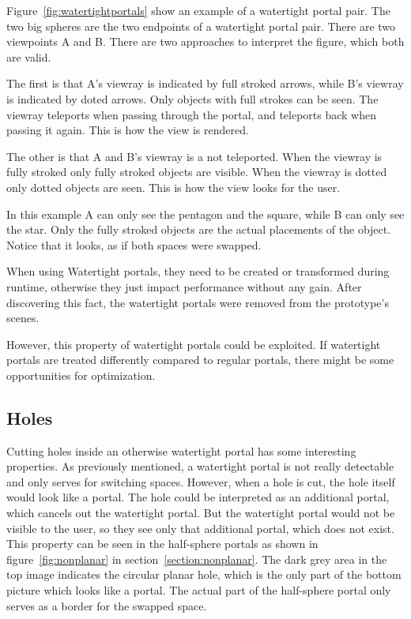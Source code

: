 Figure~\ref{fig:watertightportals} show an example of a watertight portal pair. The two big spheres are the two \glspl{endpoint} of a watertight portal pair. There are two viewpoints A and B.
There are two approaches to interpret the figure, which both are valid.

The first is that A's \gls{viewray} is indicated by full stroked arrows, while B's \gls{viewray} is indicated by doted arrows. Only objects with full strokes can be seen. The \gls{viewray} teleports when passing through the portal, and teleports back when passing it again. This is how the view is rendered.

The other is that A and B's \gls{viewray} is a not teleported. When the \gls{viewray} is fully stroked only fully stroked objects are visible. When the \gls{viewray} is dotted only dotted objects are seen. This is how the view looks for the user.

In this example A can only see the pentagon and the square, while B can only see the star. Only the fully stroked objects are the actual placements of the object. Notice that it looks, as if both spaces were swapped.

When using Watertight portals, they need to be created or transformed during runtime, otherwise they just impact performance without any gain. After discovering this fact, the watertight portals were removed from the prototype's scenes.

However, this property of watertight portals could be exploited. If watertight portals are treated differently compared to regular portals, there might be some opportunities for optimization.

\subsection{Holes}
Cutting holes inside an otherwise watertight portal has some interesting properties. As previously mentioned, a watertight portal is not really detectable and only serves for switching spaces. However, when a hole is cut, the hole itself would look like a portal. The hole could be interpreted as an additional portal, which cancels out the watertight portal. But the watertight portal would not be visible to the user, so they see only that additional portal, which does not exist. This property can be seen in the half-sphere portals as shown in figure~\ref{fig:nonplanar} in section~\ref{section:nonplanar}. The dark grey area in the top image indicates the circular planar hole, which is the only part of the bottom picture which looks like a portal. The actual part of the half-sphere portal only serves as a border for the swapped space.
